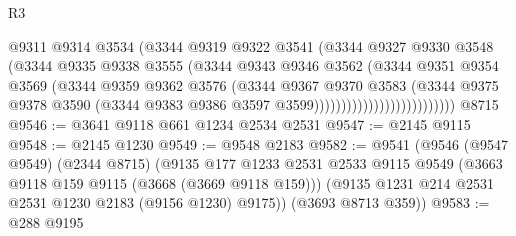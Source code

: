 \begin{lexlean}{R3}
\begin{coremodule}
                                      @9311
                                      @9314
                                      @3534
                                      (@3344
                                        @9319
                                        @9322
                                        @3541
                                        (@3344
                                          @9327
                                          @9330
                                          @3548
                                          (@3344
                                            @9335
                                            @9338
                                            @3555
                                            (@3344
                                              @9343
                                              @9346
                                              @3562
                                              (@3344
                                                @9351
                                                @9354
                                                @3569
                                                (@3344
                                                  @9359
                                                  @9362
                                                  @3576
                                                  (@3344
                                                    @9367
                                                    @9370
                                                    @3583
                                                    (@3344
                                                      @9375
                                                      @9378
                                                      @3590
                                                      (@3344
                                                        @9383
                                                        @9386
                                                        @3597
                                                        @3599))))))))))))))))))))))))))
    @8715
@9546 := @3641 @9118 @661 @1234 @2534 @2531
@9547 := @2145 @9115
@9548 := @2145 @1230
@9549 := @9548 @2183
@9582 := @9541
    (@9546
      (@9547 @9549)
      (@2344 @8715)
      (@9135
        @177
        @1233
        @2531
        @2533
        @9115
        @9549
        (@3663 @9118 @159 @9115 (@3668 (@3669 @9118 @159)))
        (@9135 @1231 @214 @2531 @2531 @1230 @2183 (@9156 @1230) @9175))
      (@3693 @8713 @359))
@9583 := @288 @9195

\end{coremodule}
\end{lexlean}

